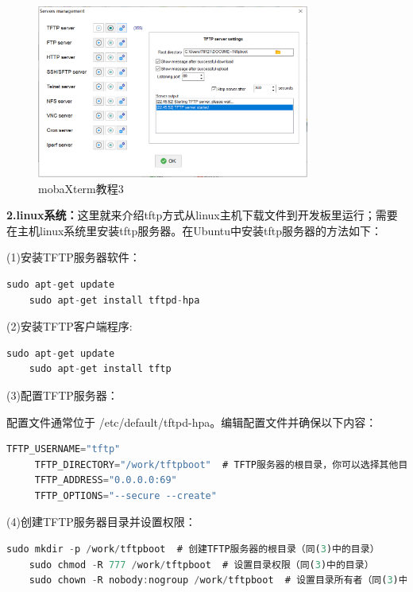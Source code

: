     \begin{figure}[h]
    	\centering
    	\includegraphics[width=0.8\textwidth]{figures/08-01-mobaXterm教程3.png}
    	\caption{mobaXterm教程3}
    	\label{mobaXterm教程3}
    \end{figure}
    
   \textbf{ 2.linux系统：}这里就来介绍tftp方式从linux主机下载文件到开发板里运行；需要在主机linux系统里安装tftp服务器。在Ubuntu中安装tftp服务器的方法如下：
    
    (1)安装TFTP服务器软件：
   
   \begin{lstlisting}[language=rust]
    sudo apt-get update
    sudo apt-get install tftpd-hpa
   \end{lstlisting}
    
    (2)安装TFTP客户端程序:
    
    \begin{lstlisting}[language=rust]
    sudo apt-get update
    sudo apt-get install tftp
    \end{lstlisting}
    
     (3)配置TFTP服务器：
     
     配置文件通常位于 /etc/default/tftpd-hpa。编辑配置文件并确保以下内容：
     
     \begin{lstlisting}[language=rust]
     TFTP_USERNAME="tftp"
     TFTP_DIRECTORY="/work/tftpboot"  # TFTP服务器的根目录，你可以选择其他目录
     TFTP_ADDRESS="0.0.0.0:69"
     TFTP_OPTIONS="--secure --create"
     \end{lstlisting}
     
     (4)创建TFTP服务器目录并设置权限：
    
    \begin{lstlisting}[language=rust]
    sudo mkdir -p /work/tftpboot  # 创建TFTP服务器的根目录（同(3)中的目录）
    sudo chmod -R 777 /work/tftpboot  # 设置目录权限（同(3)中的目录）
    sudo chown -R nobody:nogroup /work/tftpboot  # 设置目录所有者（同(3)中的目录）
    \end{lstlisting}
    
